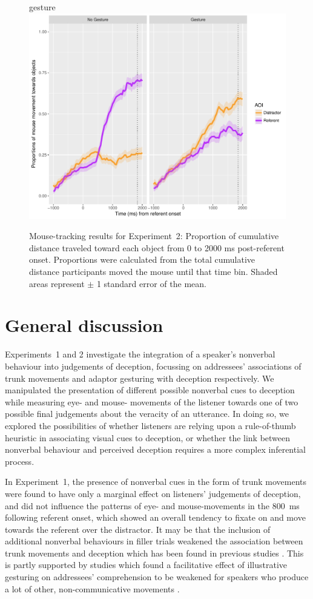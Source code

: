 \documentclass[a4paper,man,natbib]{apa6}
\begin{document}
\begin{figure}[Ht]gesture
  \centering
	\includegraphics[width=\linewidth]{./img/e8_mouset.pdf}
  \caption{Mouse-tracking results for Experiment~2: Proportion of cumulative distance traveled toward each object from 0 to 2000 ms post-referent onset. Proportions were calculated from the total cumulative distance participants moved the mouse until that time bin. Shaded areas represent $\pm$ 1 standard error of the mean.}
  \label{fig:v2_mouse}
\end{figure}

\section{General discussion}

Experiments~1 and 2 investigate the integration of a speaker's nonverbal behaviour into judgements of deception, focussing on addressees' associations of trunk movements and adaptor gesturing with deception respectively.
We manipulated the presentation of different possible nonverbal cues to deception while measuring eye- and mouse- movements of the listener towards one of two possible final judgements about the veracity of an utterance.
In doing so, we explored the possibilities of whether listeners are relying upon a rule-of-thumb heuristic in associating visual cues to deception, or whether the link between nonverbal behaviour and perceived deception requires a more complex inferential process.

In Experiment~1, the presence of nonverbal cues in the form of trunk movements were found to have only a marginal effect on listeners' judgements of deception, and did not influence the patterns of eye- and mouse-movements in the 800~ms following referent onset, which showed an overall tendency to fixate on and move towards the referent over the distractor.
It may be that the inclusion of additional nonverbal behaviours in filler trials weakened the association between trunk movements and deception which has been found in previous studies \citep[e.g][]{Vrij1996a}.
This is partly supported by studies which found a facilitative effect of illustrative gesturing on addressees' comprehension to be weakened for speakers who produce a lot of other, non-communicative movements \citep{Holle2007}.
\end{document}
